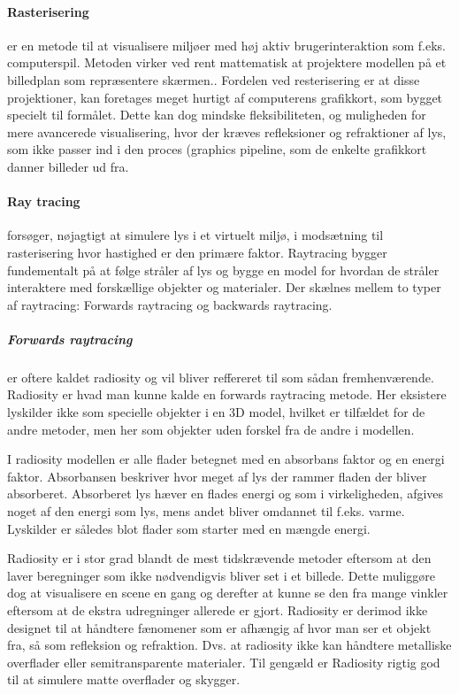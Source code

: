 \paragraph{Rasterisering}
er en metode til at visualisere miljøer med høj aktiv brugerinteraktion som f.eks. computerspil.\cite{rastarization} Metoden virker ved rent mattematisk at projektere modellen på et billedplan som repræsentere skærmen.\cite{rastarization}. Fordelen ved resterisering er at disse projektioner, kan foretages meget hurtigt af computerens grafikkort, som bygget specielt til formålet\cite{rastarization}. Dette kan dog mindske fleksibiliteten, og muligheden for mere avancerede visualisering, hvor der kræves refleksioner og refraktioner af lys, som ikke passer ind i den proces (graphics pipeline\cite{rastarization}, som de enkelte grafikkort danner billeder ud fra. 

\paragraph{Ray tracing}\cite{raytracing_for_begyndere} forsøger, nøjagtigt at simulere lys i et virtuelt miljø, i modsætning til rasterisering hvor hastighed er den primære faktor. Raytracing bygger fundementalt på at følge stråler af lys og bygge en model for hvordan de stråler interaktere med forskællige objekter og materialer. Der skælnes mellem to typer af raytracing: Forwards raytracing og backwards raytracing.

\subparagraph{Forwards raytracing}\cite{radiosity_by_wpi,radiosity_by_uob} er oftere kaldet radiosity og vil bliver reffereret til som sådan fremhenværende. Radiosity er hvad man kunne kalde en forwards raytracing metode. Her eksistere lyskilder ikke som specielle objekter i en 3D model, hvilket er tilfældet for de andre metoder, men her som objekter uden forskel fra de andre i modellen.

I radiosity modellen er alle flader betegnet med en absorbans faktor og en energi faktor. Absorbansen beskriver hvor meget af lys der rammer fladen der bliver absorberet. Absorberet lys hæver en flades energi og som i virkeligheden, afgives noget af den energi som lys, mens andet bliver omdannet til f.eks. varme. Lyskilder er således blot flader som starter med en mængde energi.

Radiosity er i stor grad blandt de mest tidskrævende metoder eftersom at den laver beregninger som ikke nødvendigvis bliver set i et billede. Dette muliggøre dog at visualisere en scene en gang og derefter at kunne se den fra mange vinkler eftersom at de ekstra udregninger allerede er gjort. Radiosity er derimod ikke designet til at håndtere fænomener som er afhængig af hvor man ser et objekt fra, så som refleksion og refraktion. Dvs. at radiosity ikke kan håndtere metalliske overflader eller semitransparente materialer. Til gengæld er Radiosity rigtig god til at simulere matte overflader og skygger.

